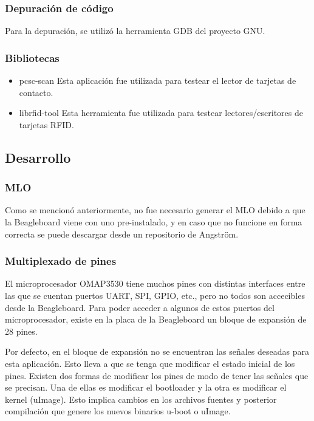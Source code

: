 \documentclass[%
        final,
        notitlepage,
        narroweqnarray,
        inline,
        ]{ieee}
\begin{document}
\subsubsection{Depuración de código}
Para la depuración, se utilizó la herramienta GDB \cite{GDB} del proyecto GNU. 


\subsubsection{Bibliotecas}

\begin{itemize}
\item pcsc-scan \cite{pcsctools_down}
Esta aplicación fue utilizada para testear el lector de tarjetas de contacto.
\item  librfid-tool 
Esta herramienta fue utilizada para testear lectores/escritores de tarjetas RFID.
\end{itemize}


\subsection{Desarrollo}

\subsubsection{MLO}
Como se mencionó anteriormente, no fue necesario generar el MLO debido a que la Beagleboard viene con uno pre-instalado, y en caso que no funcione en forma correcta se puede descargar desde un repositorio de Angström. 

\subsubsection{Multiplexado de pines}
El microprocesador OMAP3530 tiene muchos pines con distintas interfaces entre las
que se cuentan puertos UART, SPI, GPIO, etc., pero no todos son accecibles desde la Beagleboard. 
Para poder acceder a algunos de estos puertos del microprocesador, existe en la placa de la
Beagleboard un bloque de expansión de 28 pines.


Por defecto, en el bloque de expansión no se encuentran las señales deseadas para esta aplicación. Esto 
lleva a que se tenga que modificar el estado inicial de los pines. 
Existen dos formas de modificar los pines de modo de tener las señales que se precisan. Una de ellas es modificar el bootloader y la otra es modificar el kernel (uImage). Esto implica cambios en los archivos fuentes y posterior compilación que genere los nuevos binarios u-boot o uImage. 
\end{document}
